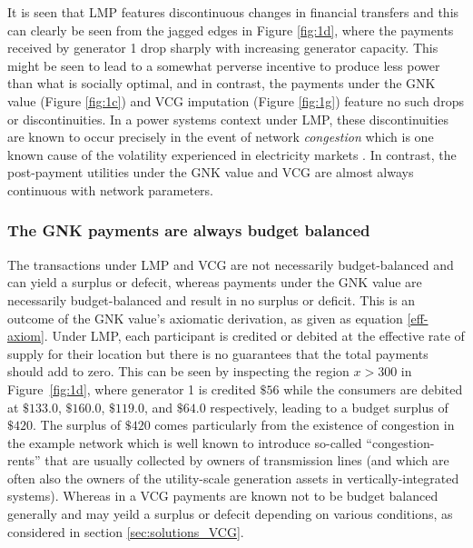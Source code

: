 It is seen that LMP features discontinuous changes in financial transfers and this can clearly be seen from the jagged edges in Figure \ref{fig:1d}, where the payments received by generator 1 drop sharply with increasing generator capacity.
This might be seen to lead to a somewhat perverse incentive to produce less power than what is socially optimal, and in contrast, the payments under the GNK value (Figure \ref{fig:1c}) and VCG imputation (Figure \ref{fig:1g}) feature no such drops or discontinuities.
In a power systems context under LMP, these discontinuities are known to occur precisely in the event of network \emph{congestion}
which is one known cause of the volatility experienced in electricity markets \cite{RePEc:aen:journl:2006v27-02-a09}. 
In contrast, the post-payment utilities under the GNK value and VCG are almost always continuous with network parameters.



\subsubsection*{The GNK payments are always budget balanced}
The transactions under LMP and VCG are not necessarily budget-balanced and can yield a surplus or defecit, whereas payments under the GNK value are necessarily budget-balanced and result in no surplus or deficit.
This is an outcome of the GNK value's axiomatic derivation, as given as equation \eqref{eff-axiom}.
Under LMP, each participant is credited or debited at the effective rate of supply for their location but there is no guarantees that the total payments should add to zero.
This can be seen by inspecting the region $x>300$ in Figure~\ref{fig:1d}, where generator 1 is credited $\$56$ while the consumers are debited at $\$133.0$, $\$160.0$, $\$119.0$, and $\$64.0$ respectively, leading to a budget surplus of $\$420$.
The surplus of $\$420$ comes particularly from the existence of congestion in the example network which is well known to introduce so-called ``congestion-rents'' that are usually collected by owners of transmission lines \cite{lmp2} (and which are often also the owners of the utility-scale generation assets in vertically-integrated systems).
Whereas in a VCG payments are known not to be budget balanced generally and may yeild a surplus or defecit depending on various conditions, as considered in section \ref{sec:solutions_VCG}.

